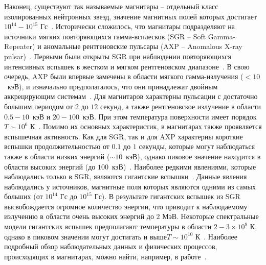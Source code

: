 Наконец, существуют так называемые магнитары -- отдельный класс 
изолированных нейтронных звезд, значение магнитных полей которых достигает 
$10^{14} - 10^{15}$ 
Гс~\cite{Mitrofanov:1982,Duncan:1992,Thompson:1995,Thompson:1996,DongLai:2001,Lyutikov:2002}.
 Исторически сложилось, что магнитары подразделяют на источники мягких 
повторяющихся гамма-всплесков (SGR -- Soft Gamma-Repeater) и аномальные 
рентгеновские пульсары (AXP -- Anomalous \linebreak X-ray 
pulsar)~\cite{Kouveliotou:1998ze,Kouveliotou:1998fd,Gavriil:2002mc,Ibrahim:2002zw,Ibrahim:2002zy,Olausen:2014,vanParad:1995}.
 Первыми были открыты SGR при наблюдении повторяющихся интенсивных вспышек в 
жестком и мягком рентгеновском диапазоне~\cite{Mazets:1979}. В свою очередь, 
AXP были впервые замечены в области мягкого гамма-излучения ($<10$~кэВ), и 
изначально предполагалось, что они принадлежат двойным аккрецирующим 
системам~\cite{Mereghetti:1995}. Для магнитаров характерны пульсации с 
достаточно большим периодом от $2$ до $12$ секунд, а также рентгеновское 
излучение в области $0.5 - 10$~кэВ и $20 - 100$~кэВ. При этом температура 
поверхности имеет порядок $T\sim 10^6$ К~\cite{Yakovlev:2004}. Помимо их 
основных характеристик, в магнитарах также проявляется вспышечная активность. 
Как для SGR, так и для AXP характерны короткие вспышки продолжительностью от 
$0.1$  до $1$ секунды, которые могут наблюдаться также в области низких энергий 
($\sim 10$~кэВ), однако пиковое значение находится в области высоких энергий 
(до $100$~кэВ)~\cite{Younes:2021}. Наиболее редкими явлениями, которые 
наблюдались только в SGR, являются гигантские 
вспышки~\cite{Mazets:1979,Hurley:1999,Hurley:1999b,Hurley:2005}. Данные явления 
наблюдались у источников, магнитные поля которых являются одними из самых 
больших (от $10^{14}$ Гс до $10^{15}$ Гс).  В результате гигантских вспышек из 
SGR высвобождается огромное количество энергии, что приводит к наблюдаемому 
излучению в области очень высоких энергий до $2$ МэВ. Некоторые спектральные 
модели гигантских вспышек предполагают температуры в области \mbox{$2-3\times 
10^9$} К, однако в пиковом значении могут достигать и выше\linebreak $T\sim 
10^{10}$ К~\cite{Hurley:1999}. Наиболее подробный обзор наблюдательных данных и 
физических процессов, происходящих в магнитарах, можно найти, например, в 
работе~\cite{Kaspi:2017}.


